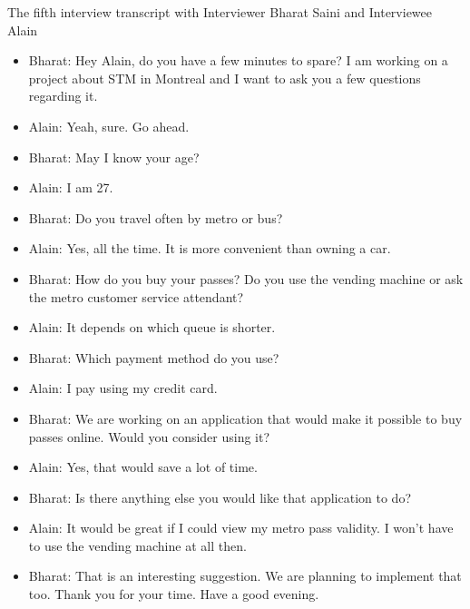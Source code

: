 The fifth interview transcript with Interviewer Bharat Saini and Interviewee Alain

\begin{itemize}
    \item[] Bharat: Hey Alain, do you have a few minutes to spare? I am working on a project about STM in Montreal and I want to ask you a few questions regarding it.
    \item[] Alain: Yeah, sure. Go ahead.
    \item[] Bharat: May I know your age?
    \item[] Alain: I am 27.
    \item[] Bharat: Do you travel often by metro or bus?
    \item[] Alain: Yes, all the time. It is more convenient than owning a car.
    \item[] Bharat: How do you buy your passes? Do you use the vending machine or ask the metro customer service attendant? 
    \item[] Alain: It depends on which queue is shorter.
    \item[] Bharat: Which payment method do you use?
    \item[] Alain: I pay using my credit card.
    \item[] Bharat: We are working on an application that would make it possible to buy passes online. Would you consider using it?
    \item[] Alain: Yes, that would save a lot of time. 
    \item[] Bharat: Is there anything else you would like that application to do?
    \item[] Alain: It would be great if I could view my metro pass validity. I won’t have to use the vending machine at all then. 
    \item[] Bharat: That is an interesting suggestion. We are planning to implement that too. Thank you for your time. Have a good evening.
\end{itemize}
\pagebreak